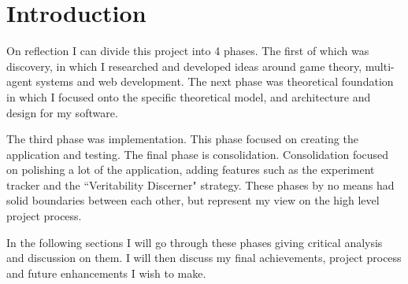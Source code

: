 \documentclass[]{final_report}
\begin{document}
\section{Introduction}
On reflection I can divide this project into 4 phases. The first of which was discovery, in which I researched and developed ideas around game theory, multi-agent systems and web development. The next phase was theoretical foundation in which I focused onto the specific theoretical model, and architecture and design for my software.\par 
The third phase was implementation. This phase focused on creating the application and testing. The final phase is consolidation. Consolidation focused on polishing a lot of the application, adding features such as the experiment tracker and the ``Veritability Discerner" strategy. These phases by no means had solid boundaries between each other, but represent my view on the high level project process.\par 
In the following sections I will go through these phases giving critical analysis and discussion on them. I will then discuss my final achievements, project process and future enhancements I wish to make.
\end{document}
